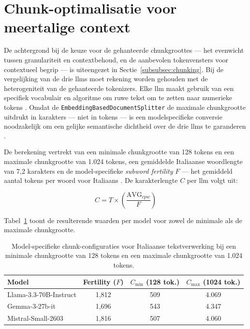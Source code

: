 \section{Chunk-optimalisatie voor meertalige context}
\label{sec:technische-uitvoering-chunking}

De achtergrond bij de keuze voor de gehanteerde chunkgroottes — het evenwicht tussen granulariteit en contextbehoud, en de aanbevolen tokenvensters voor contextueel begrip — is uiteengezet in Sectie~\ref{subsubsec:chunking}. Bij de vergelijking van de drie \glspl{llm} moet rekening worden gehouden met de heterogeniteit van de gehanteerde tokenizers. Elke \gls{llm} maakt gebruik van een specifiek vocabulair en algoritme om ruwe tekst om te zetten naar numerieke tokens \autocite{Wu2016, Kudo2018}. Omdat de \texttt{EmbeddingBasedDocumentSplitter} de maximale chunkgrootte uitdrukt in karakters — niet in tokens — is een modelspecifieke conversie noodzakelijk om een gelijke semantische dichtheid over de drie \glspl{llm} te garanderen \autocite{HaystackEbds2026}.

De berekening vertrekt van een minimale chunkgrootte van 128 tokens en een maximale chunkgrootte van 1.024 tokens, een gemiddelde Italiaanse woordlengte van 7,2 karakters \autocite{Eurotrad2022} en de model-specifieke \textit{subword fertility} $F$ — het gemiddeld aantal tokens per woord voor Italiaans \autocite{Allal2025}. De karakterlengte $C$ per \gls{llm} volgt uit:

\begin{equation}
C = T \times \left( \frac{\text{AVG}_{cpw}}{F} \right)
\end{equation}

Tabel~\ref{tab:chunk-specs} toont de resulterende waarden per model voor zowel de minimale als de maximale chunkgrootte.

\begin{table}[h]
\centering
\small
\begin{tabular}{lccc}
\toprule
\textbf{Model} & \textbf{Fertility ($F$)} & \textbf{$C_{\min}$ (128 tok.)} & \textbf{$C_{\max}$ (1024 tok.)} \\
\midrule
Llama-3.3-70B-Instruct   & 1,812 & 509 & 4.069 \\
Gemma-3-27b-it           & 1,696 & 543 & 4.347 \\
Mistral-Small-2603       & 1,816 & 507 & 4.060 \\
\bottomrule
\end{tabular}
\caption[Model-specifieke chunk-configuraties voor Italiaanse tekst]{\label{tab:chunk-specs}Model-specifieke chunk-configuraties voor Italiaanse tekstverwerking bij een minimale chunkgrootte van 128 tokens en een maximale chunkgrootte van 1.024 tokens.}
\end{table}

